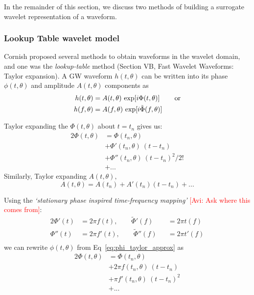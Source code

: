 \documentclass{article}
\newcommand{\avi}[1]{\textcolor{red}{[Avi: #1]}}
\begin{document}
In the remainder of this section, we discuss two methods of building a surrogate wavelet representation of a waveform.

\subsubsection{Lookup Table wavelet model}
Cornish proposed several methods to obtain waveforms in the wavelet domain, and one was the \textit{lookup-table} method (Section VB, Fast Wavelet Waveforms: Taylor expansion). A GW waveform $h(t, \theta)$ can be written into its phase $\phi(t, \theta)$ and amplitude $A(t,\theta)$ components as 
\begin{align}
h(t,\theta)&=A(t,\theta)\ {\rm exp}[i\Phi(t,\theta)]\,\hspace{2em} {\rm or} \label{eq:ht}\\
h(f,\theta)&=A(f,\theta)\ {\rm exp}[i\tilde{\Phi}(f,\theta)]\,
\end{align}

Taylor expanding the $\Phi(t,\theta)$ about $t=t_n$ gives us:
\begin{alignat}{2}
    \Phi(t,\theta) &= \Phi(t_n, \theta) \nonumber\\
                   &  + \Phi'(t_n, \theta)\ (t - t_n) \nonumber\\
                   &  + \Phi''(t_n, \theta)\ (t - t_n)^2/2! \nonumber\\
                   &  + ... \label{eq:phi_taylor_approx}
\end{alignat}
Similarly, Taylor expanding $A(t, \theta),$
\begin{equation}
    A(t,\theta) = A(t_n) + A'(t_n)(t-t_n) + ...
\end{equation}

Using the \textit{`stationary phase inspired time-frequency mapping'} \avi{Ask where this comes from}:
\begin{alignat*}{2}
\Phi'(t) &= 2\pi f(t) ,\hspace{2em} \tilde{\Phi}'(f) &&= 2\pi t(f) \\
\Phi''(t) &= 2\pi f'(t) ,\hspace{2em} \tilde{\Phi}''(f) &&= 2\pi t'(f) \\
\end{alignat*}
we can rewrite $\phi(t,\theta)$ from Eq~\ref{eq:phi_taylor_approx} as 
\begin{alignat}{2}
    \Phi(t,\theta) &= \Phi(t_n, \theta) \nonumber\\
                   &  + 2\pi f(t_n, \theta)\ (t - t_n) \nonumber\\
                   &  + \pi f'(t_n, \theta)\ (t - t_n)^2 \nonumber\\
                   &  + ... \label{eq:phi_taylor_approx_2} 
\end{alignat}
\end{document}
